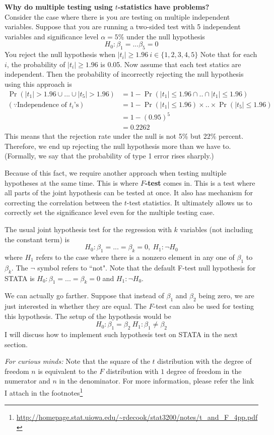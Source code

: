 \documentclass[12pt]{article}
\theoremstyle{definition}
\theoremstyle{property}
\theoremstyle{assumption}
\theoremstyle{example}
\theoremstyle{comment}
\begin{document}
\begin{mdframed}[backgroundcolor=blue!5] 
\textbf{Why do multiple testing using $t$-statistics have problems?} \medskip \\ 
Consider the case where there is you are testing on multiple independent variables. Suppose that you are running a two-sided test with 5 independent variables and significance level $\alpha = 5\%$ under the null hypothesis
\[
H_0: \beta_1=...\beta_5=0
\]
You reject the null hypothesis when $|t_i|\geq 1.96 \ i\in\{1,2,3,4,5\}$ Note that for each $i$, the probability of $|t_i|\geq 1.96$ is 0.05. Now assume that each test statics are independent. Then the probability of incorrectly rejecting the null hypothesis using this approach is
\[
\begin{aligned}
\Pr(|t_1|>1.96 \cup...\cup |t_5|>1.96) & =1-\Pr(|t_1|\leq1.96\cap .. \cap|t_1|\leq1.96)\\
(\because\text{Independence of $t_i$'s}) \ \ &=1-\Pr(|t_1|\leq1.96)\times ..\times\Pr(|t_5|\leq1.96) \\
 & = 1-(0.95)^5 \\
 &= 0.2262
\end{aligned}
\]
This means that the rejection rate under the null is not 5\% but 22\% percent. Therefore, we end up rejecting the null hypothesis more than we have to. (Formally, we say that the probability of type 1 error rises sharply.) 
\end{mdframed} \par\medskip
Because of this fact, we require another approach when testing multiple hypotheses at the same time. This is where \textbf{$F$-test} comes in. This is a test where all parts of the joint hypothesis can be tested at once. It also has mechanism for correcting the correlation between the $t$-test statistics. It ultimately allows us to correctly set the significance level even for the multiple testing case. \par\medskip
The usual joint hypothesis test for the regression with $k$ variables (not including the constant term) is
\[
H_0: \beta_1 = ... =\beta_k=0, \ H_1:\lnot H_0
\]
where $H_1$ refers to the case where there is a nonzero element in any one of $\beta_1$ to $\beta_k$. The $\lnot$ symbol refers to ``not". Note that the default F-test null hypothesis for STATA is $H_0:\beta_1 = ... =\beta_k=0$ and $H_1: \lnot H_0$.\par\medskip
We can actually go farther. Suppose that instead of $\beta_1$ and $\beta_2$ being zero, we are just interested in whether they are equal. The $F$-test can also be used for testing this hypothesis. The setup of the hypothesis would be
\[
H_0: \beta_1 = \beta_2 \ H_1: \beta_1 \neq \beta_2
\]
I will discuss how to implement such hypothesis test on STATA in the next section. \par\medskip
\noindent
\textit{For curious minds: } Note that the square of the $t$ distribution with the degree of freedom $n$ is equivalent to the $F$ distribution with $1$ degree of freedom in the numerator and $n$ in the denominator. For more information, please refer the link I attach in the footnotes\footnote{\url{http://homepage.stat.uiowa.edu/~rdecook/stat3200/notes/t_and_F_4pp.pdf}}
\end{document}
